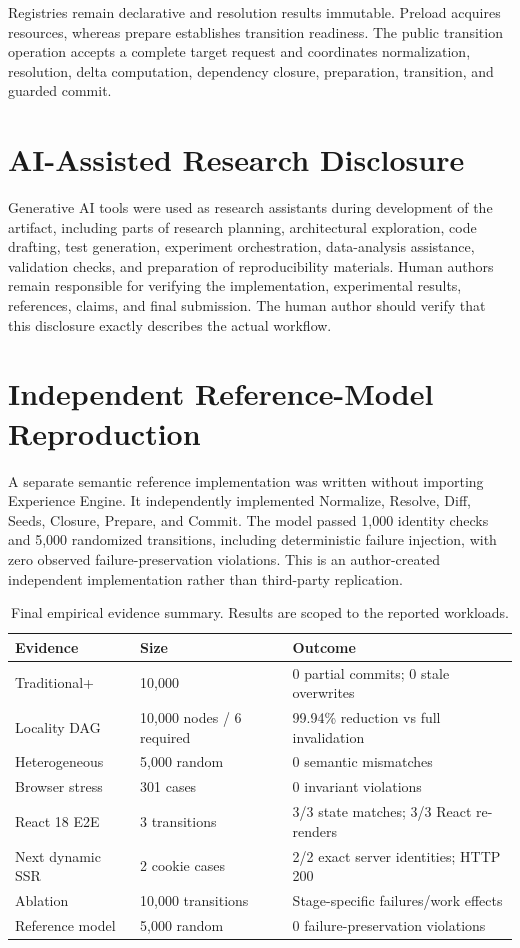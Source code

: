 \documentclass[manuscript]{acmart}
\begin{document}
Registries remain declarative and resolution results immutable. Preload acquires resources,
whereas prepare establishes transition readiness. The public transition operation accepts a
complete target request and coordinates normalization, resolution, delta computation,
dependency closure, preparation, transition, and guarded commit.

\section{AI-Assisted Research Disclosure}
Generative AI tools were used as research assistants during development of the artifact,
including parts of research planning, architectural exploration, code drafting, test generation,
experiment orchestration, data-analysis assistance, validation checks, and preparation of
reproducibility materials. Human authors remain responsible for verifying the implementation,
experimental results, references, claims, and final submission. The human author should
verify that this disclosure exactly describes the actual workflow.

\section{Independent Reference-Model Reproduction}
A separate semantic reference implementation was written without importing Experience Engine.
It independently implemented Normalize, Resolve, Diff, Seeds, Closure, Prepare, and Commit.
The model passed 1,000 identity checks and 5,000 randomized transitions, including
deterministic failure injection, with zero observed failure-preservation violations. This is
an author-created independent implementation rather than third-party replication.


\begin{table}[t]
\centering
\caption{Final empirical evidence summary. Results are scoped to the reported workloads.}
\label{tab:evidence}
\small
\begin{tabular}{p{}p{}p{}}
\toprule
Evidence & Size & Outcome\\
\midrule
Traditional+ & 10,000 & 0 partial commits; 0 stale overwrites\\
Locality DAG & 10,000 nodes / 6 required & 99.94\% reduction vs full invalidation\\
Heterogeneous & 5,000 random & 0 semantic mismatches\\
Browser stress & 301 cases & 0 invariant violations\\
React 18 E2E & 3 transitions & 3/3 state matches; 3/3 React re-renders\\
Next dynamic SSR & 2 cookie cases & 2/2 exact server identities; HTTP 200\\
Ablation & 10,000 transitions & Stage-specific failures/work effects\\
Reference model & 5,000 random & 0 failure-preservation violations\\
\bottomrule
\end{tabular}
\end{table}
\end{document}
